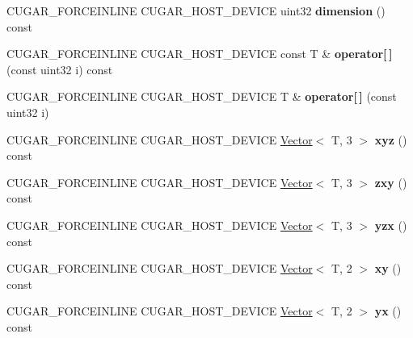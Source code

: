 \begin{DoxyCompactItemize}
C\+U\+G\+A\+R\+\_\+\+F\+O\+R\+C\+E\+I\+N\+L\+I\+NE C\+U\+G\+A\+R\+\_\+\+H\+O\+S\+T\+\_\+\+D\+E\+V\+I\+CE uint32 {\bfseries dimension} () const
\item 
\mbox{\label{structcugar_1_1_vector_3_01_t_00_013_01_4_a8cfc9c9349dd823ec06200ee9a541d24}} 
C\+U\+G\+A\+R\+\_\+\+F\+O\+R\+C\+E\+I\+N\+L\+I\+NE C\+U\+G\+A\+R\+\_\+\+H\+O\+S\+T\+\_\+\+D\+E\+V\+I\+CE const T \& {\bfseries operator\mbox{[}$\,$\mbox{]}} (const uint32 i) const
\item 
\mbox{\label{structcugar_1_1_vector_3_01_t_00_013_01_4_a71fd309b756104f03cb97febea2da504}} 
C\+U\+G\+A\+R\+\_\+\+F\+O\+R\+C\+E\+I\+N\+L\+I\+NE C\+U\+G\+A\+R\+\_\+\+H\+O\+S\+T\+\_\+\+D\+E\+V\+I\+CE T \& {\bfseries operator\mbox{[}$\,$\mbox{]}} (const uint32 i)
\item 
\mbox{\label{structcugar_1_1_vector_3_01_t_00_013_01_4_a6834427df748a5be716b8080a50069a4}} 
C\+U\+G\+A\+R\+\_\+\+F\+O\+R\+C\+E\+I\+N\+L\+I\+NE C\+U\+G\+A\+R\+\_\+\+H\+O\+S\+T\+\_\+\+D\+E\+V\+I\+CE \hyperlink{structcugar_1_1_vector}{Vector}$<$ T, 3 $>$ {\bfseries xyz} () const
\item 
\mbox{\label{structcugar_1_1_vector_3_01_t_00_013_01_4_a5ed408466ae888d535aa7141599c2302}} 
C\+U\+G\+A\+R\+\_\+\+F\+O\+R\+C\+E\+I\+N\+L\+I\+NE C\+U\+G\+A\+R\+\_\+\+H\+O\+S\+T\+\_\+\+D\+E\+V\+I\+CE \hyperlink{structcugar_1_1_vector}{Vector}$<$ T, 3 $>$ {\bfseries zxy} () const
\item 
\mbox{\label{structcugar_1_1_vector_3_01_t_00_013_01_4_ae14b5c9f796e0594594b5788b5deaf2c}} 
C\+U\+G\+A\+R\+\_\+\+F\+O\+R\+C\+E\+I\+N\+L\+I\+NE C\+U\+G\+A\+R\+\_\+\+H\+O\+S\+T\+\_\+\+D\+E\+V\+I\+CE \hyperlink{structcugar_1_1_vector}{Vector}$<$ T, 3 $>$ {\bfseries yzx} () const
\item 
\mbox{\label{structcugar_1_1_vector_3_01_t_00_013_01_4_a7e63cedace24f61ca4ba598ea4dfc2b1}} 
C\+U\+G\+A\+R\+\_\+\+F\+O\+R\+C\+E\+I\+N\+L\+I\+NE C\+U\+G\+A\+R\+\_\+\+H\+O\+S\+T\+\_\+\+D\+E\+V\+I\+CE \hyperlink{structcugar_1_1_vector}{Vector}$<$ T, 2 $>$ {\bfseries xy} () const
\item 
\mbox{\label{structcugar_1_1_vector_3_01_t_00_013_01_4_a4338831080725f3dfd42e605ca0d5f20}} 
C\+U\+G\+A\+R\+\_\+\+F\+O\+R\+C\+E\+I\+N\+L\+I\+NE C\+U\+G\+A\+R\+\_\+\+H\+O\+S\+T\+\_\+\+D\+E\+V\+I\+CE \hyperlink{structcugar_1_1_vector}{Vector}$<$ T, 2 $>$ {\bfseries yx} () const
\end{DoxyCompactItemize}
